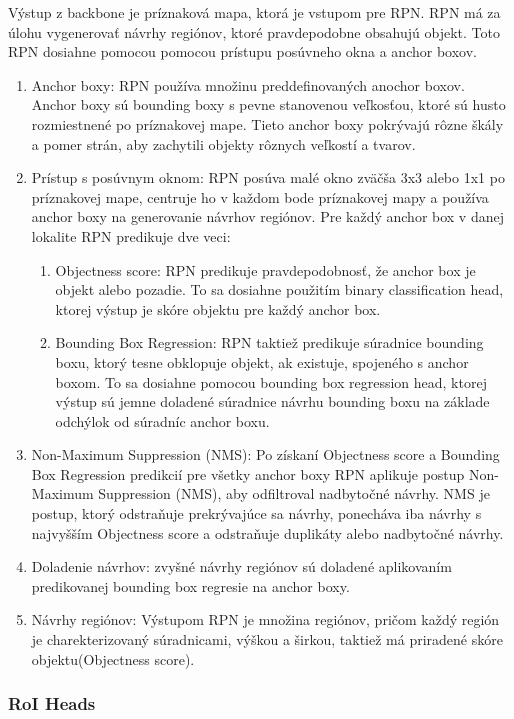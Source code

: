 Výstup z backbone je príznaková mapa, ktorá je vstupom pre RPN. RPN má za úlohu vygenerovať návrhy regiónov, ktoré pravdepodobne obsahujú objekt. Toto RPN dosiahne pomocou pomocou prístupu posúvneho okna a anchor boxov.
\begin{enumerate}
  \item Anchor boxy: RPN používa množinu preddefinovaných anochor boxov. Anchor boxy sú bounding boxy s pevne stanovenou veľkosťou, ktoré sú husto rozmiestnené po príznakovej mape. Tieto anchor boxy pokrývajú rôzne škály a pomer strán, aby zachytili objekty rôznych veľkostí a tvarov. 
  \item Prístup s posúvnym oknom: RPN posúva malé okno zväčša 3x3 alebo 1x1 po príznakovej mape, centruje ho v každom bode príznakovej mapy a používa anchor boxy na generovanie návrhov regiónov. Pre každý anchor box v danej lokalite RPN predikuje dve veci: 
  \begin{enumerate}
  \item Objectness score: RPN predikuje pravdepodobnosť, že anchor box je objekt alebo pozadie. To sa dosiahne použitím binary classification head, ktorej výstup je skóre objektu pre každý anchor box.
  \item Bounding Box Regression: RPN taktiež predikuje súradnice bounding boxu, ktorý tesne obklopuje objekt, ak existuje, spojeného s anchor boxom. To sa dosiahne pomocou bounding box regression head, ktorej výstup sú jemne doladené súradnice návrhu bounding boxu na základe odchýlok od súradníc anchor boxu.
  \end{enumerate}
  \item Non-Maximum Suppression (NMS): Po získaní Objectness score a Bounding Box Regression predikcií pre všetky anchor boxy RPN aplikuje postup Non-Maximum Suppression (NMS), aby odfiltroval nadbytočné návrhy. NMS je postup, ktorý odstraňuje prekrývajúce sa návrhy, ponecháva iba návrhy s najvyšším Objectness score a odstraňuje duplikáty alebo nadbytočné návrhy.
  \item Doladenie návrhov: zvyšné návrhy regiónov sú doladené aplikovaním predikovanej bounding box regresie na anchor boxy.  
  \item Návrhy regiónov: Výstupom RPN je množina regiónov, pričom každý región je charekterizovaný súradnicami, výškou a širkou, taktiež má priradené skóre objektu(Objectness score).
\end{enumerate}

\subsubsection{RoI Heads}

